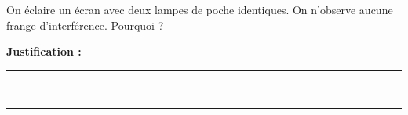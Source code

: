 On éclaire un écran avec deux lampes de poche identiques. On n'observe aucune frange d'interférence. Pourquoi ?

\choices

\noindent\textbf{Justification :} \hrulefill \\[2.5ex]
\rule{\linewidth}{0.4pt} \\[2.5ex]
\rule{\linewidth}{0.4pt}
\vfill

